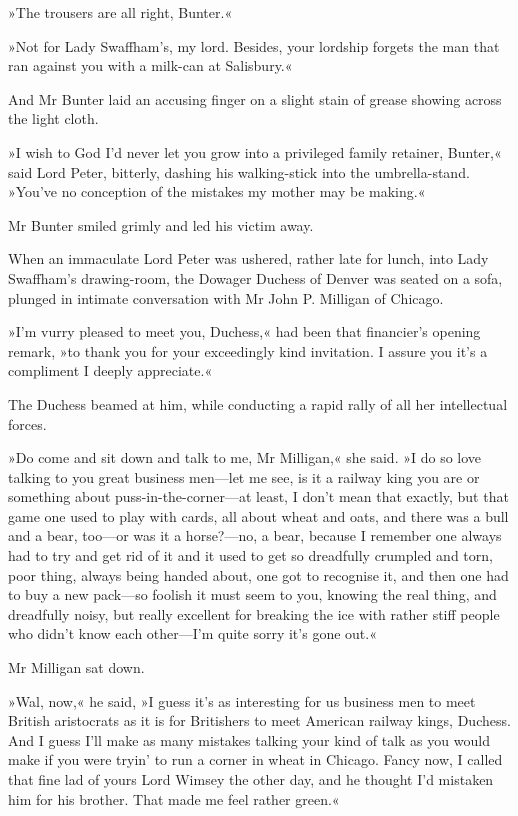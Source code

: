 »The trousers are all right, Bunter.«

»Not for Lady Swaffham's, my lord. Besides, your lordship forgets the man that ran against you with a milk-can at Salisbury.«

And Mr Bunter laid an accusing finger on a slight stain of grease showing across the light cloth.

»I wish to God I'd never let you grow into a privileged family retainer, Bunter,« said Lord Peter, bitterly, dashing his walking-stick into the umbrella-stand. »You've no conception of the mistakes my mother may be making.«

Mr Bunter smiled grimly and led his victim away.

When an immaculate Lord Peter was ushered, rather late for lunch, into Lady Swaffham's drawing-room, the Dowager Duchess of Denver was seated on a sofa, plunged in intimate conversation with Mr John P. Milligan of Chicago.

»I'm vurry pleased to meet you, Duchess,« had been that financier's opening remark, »to thank you for your exceedingly kind invitation. I assure you it's a compliment I deeply appreciate.«

The Duchess beamed at him, while conducting a rapid rally of all her intellectual forces.

»Do come and sit down and talk to me, Mr Milligan,« she said. »I do so love talking to you great business men—let me see, is it a railway king you are or something about puss-in-the-corner—at least, I don't mean that exactly, but that game one used to play with cards, all about wheat and oats, and there was a bull and a bear, too—or was it a horse?---no, a bear, because I remember one always had to try and get rid of it and it used to get so dreadfully crumpled and torn, poor thing, always being handed about, one got to recognise it, and then one had to buy a new pack—so foolish it must seem to you, knowing the real thing, and dreadfully noisy, but really excellent for breaking the ice with rather stiff people who didn't know each other—I'm quite sorry it's gone out.«

Mr Milligan sat down.

»Wal, now,« he said, »I guess it's as interesting for us business men to meet British aristocrats as it is for Britishers to meet American railway kings, Duchess. And I guess I'll make as many mistakes talking your kind of talk as you would make if you were tryin' to run a corner in wheat in Chicago. Fancy now, I called that fine lad of yours Lord Wimsey the other day, and he thought I'd mistaken him for his brother. That made me feel rather green.«

